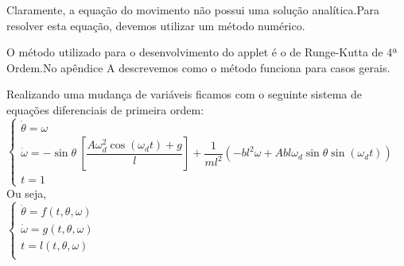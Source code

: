 \documentclass[13pt,a4paper]{report}
\begin{document}
	Claramente, a equação do movimento não possui uma solução analítica.Para resolver esta equação, devemos utilizar um método numérico.
	
	O método utilizado para o desenvolvimento do applet é o de Runge-Kutta de 4ª Ordem.No apêndice A descrevemos como o método funciona para casos gerais.

Realizando uma mudança de variáveis ficamos com o seguinte sistema de equações diferenciais de primeira ordem:
\\[2mm]
$ \left\{
\begin{array}{ll}

 	\dot{\theta}  = \omega \\
	 	\dot{\omega}  = -\sin\theta\ 	 	
	 	\left[\dfrac{A\omega_{d}^{2} \cos(\omega_{d} t) + g }{l}\right]
	 	+ \dfrac{1}{ml^{2}} 	\left( -bl^{2}\omega + Abl\omega_{d}\sin\theta\sin(\omega_{d}t)	\right) \\
	 t = 1

\end{array}
\right.
$
\\[2mm]

Ou seja,
\\[2mm]
$
\left\{
\begin{array}{ll}
 	\dot{\theta}  = f(t,\theta,\omega) \\
 	\dot{\omega}  = g(t,\theta,\omega) \\ 	
	 t = l(t,\theta,\omega) \\
\end{array}
\right.
$
\\[2mm]
\end{document}
